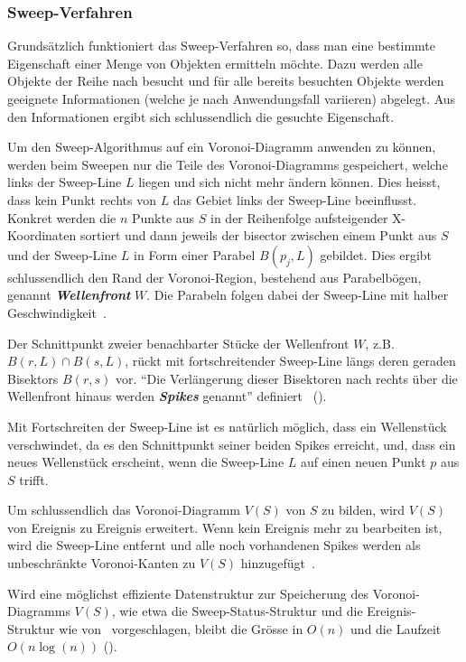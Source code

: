 \subsubsection{Sweep-Verfahren}
\label{ssub:voronoiAlgorithmsSweep}
Grundsätzlich funktioniert das Sweep-Verfahren so, dass man eine bestimmte Eigenschaft einer Menge von Objekten ermitteln möchte. Dazu werden alle Objekte der Reihe nach besucht und für alle bereits besuchten Objekte werden geeignete Informationen (welche je nach Anwendungsfall variieren) abgelegt. Aus den Informationen ergibt sich schlussendlich die gesuchte Eigenschaft.

Um den Sweep-Algorithmus auf ein Voronoi-Diagramm anwenden zu können, werden beim Sweepen nur die Teile des Voronoi-Diagramms gespeichert, welche links der Sweep-Line $L$ liegen und sich nicht mehr ändern können. Dies heisst, dass kein Punkt rechts von $L$ das Gebiet links der Sweep-Line beeinflusst. Konkret werden die $n$ Punkte aus $S$ in der Reihenfolge aufsteigender X-Koordinaten sortiert und dann jeweils der \gls{bisector} zwischen einem Punkt aus $S$ und der Sweep-Line $L$ in Form einer Parabel $B(p_j, L)$ gebildet. Dies ergibt schlussendlich den Rand der Voronoi-Region, bestehend aus Parabelbögen, genannt \textit{\textbf{Wellenfront}} $W$. Die Parabeln folgen dabei der Sweep-Line mit halber Geschwindigkeit~\parencite[S. 288]{klein2005algorithmischegeometrie}.

Der Schnittpunkt zweier benachbarter Stücke der Wellenfront $W$, z.B. $B(r, L) \cap B(s, L)$, rückt mit fortschreitender Sweep-Line längs deren geraden Bisektors $B(r, s)$ vor. ``Die Verlängerung dieser Bisektoren nach rechts über die Wellenfront hinaus werden \textbf{\textit{Spikes}} genannt'' definiert~\citeauthor{klein2005algorithmischegeometrie} (\citeyear[S. 289]{klein2005algorithmischegeometrie}).

Mit Fortschreiten der Sweep-Line ist es natürlich möglich, dass ein Wellenstück verschwindet, da es den Schnittpunkt seiner beiden Spikes erreicht, und, dass ein neues Wellenstück erscheint, wenn die Sweep-Line $L$ auf einen neuen Punkt $p$ aus $S$ trifft.

Um schlussendlich das Voronoi-Diagramm $V(S)$ von $S$ zu bilden, wird $V(S)$ von Ereignis zu Ereignis erweitert. Wenn kein Ereignis mehr zu bearbeiten ist, wird die Sweep-Line entfernt und alle noch vorhandenen Spikes werden als unbeschränkte Voronoi-Kanten zu $V(S)$ hinzugefügt~\parencite[S. 289 bis 291]{klein2005algorithmischegeometrie}.

Wird eine möglichst effiziente Datenstruktur zur Speicherung des Voronoi-Diagramms $V(S)$, wie etwa die Sweep-Status-Struktur und die Ereignis-Struktur wie von~\citeauthor{klein2005algorithmischegeometrie} vorgeschlagen, bleibt die Grösse in $O(n)$ und die Laufzeit $O(n \log(n))$ (\citeyear[S. 294]{klein2005algorithmischegeometrie}).

